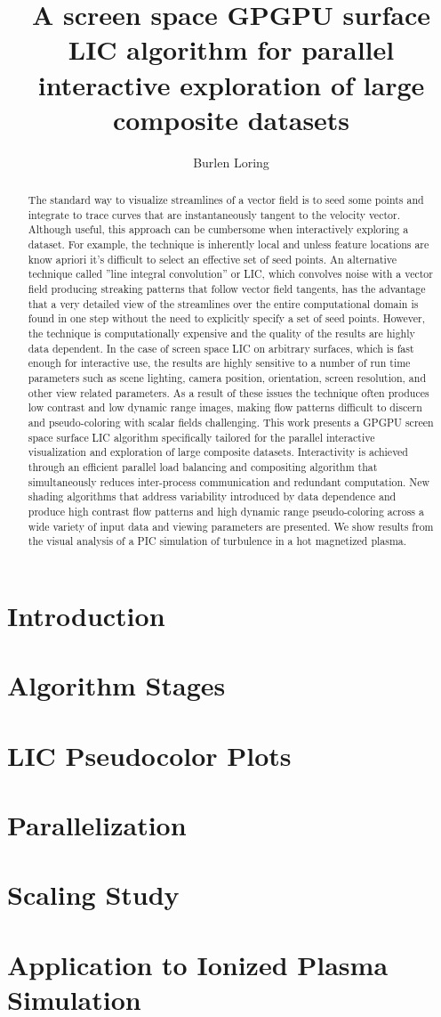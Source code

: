 \documentclass[a4paper,10pt]{article}
\title{A screen space GPGPU surface LIC algorithm for parallel interactive exploration of large composite datasets}
\author{Burlen Loring}
\begin{document}
\maketitle

\begin{abstract}
The standard way to visualize streamlines of a vector field is to seed some points and integrate to trace curves that are instantaneously tangent to the velocity vector. Although useful, this approach can be cumbersome when interactively exploring a dataset. For example, the technique is inherently local and unless feature locations are know apriori it's difficult to select an effective set of seed points. An alternative technique called ”line integral convolution” or LIC, which convolves noise with a vector field producing streaking patterns that follow vector field tangents, has the advantage that a very detailed view of the streamlines over the entire computational domain is found in one step without the need to explicitly specify a set of seed points. However, the technique is computationally expensive and the quality of the results are highly data dependent. In the case of screen space LIC on arbitrary surfaces, which is fast enough for interactive use, the results are highly sensitive to a number of run time parameters such as scene lighting, camera position, orientation, screen resolution, and other view related parameters. As a result of these issues the technique often produces low contrast and low dynamic range images, making flow patterns difficult to discern and pseudo-coloring with scalar fields challenging. This work presents a GPGPU screen space surface LIC algorithm specifically tailored for the parallel interactive visualization and exploration of large composite datasets. Interactivity is achieved through an efficient parallel load balancing and compositing algorithm that simultaneously reduces inter-process communication and redundant computation. New shading algorithms that address variability introduced by data dependence and produce high contrast flow patterns and high dynamic range pseudo-coloring across a wide variety of input data and viewing parameters are presented. We show results from the visual analysis of a PIC simulation of turbulence in a hot magnetized plasma.
\end{abstract}

\section{Introduction}
\section{Algorithm Stages}
\section{LIC Pseudocolor Plots}
\section{Parallelization}
\section{Scaling Study}
\section{Application to Ionized Plasma Simulation}
\end{document}

